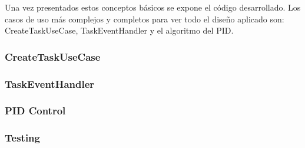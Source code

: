 Una vez presentados estos conceptos básicos se expone el código desarrollado.
Los casos de uso más complejos y completos para ver todo el diseño aplicado son: CreateTaskUseCase, TaskEventHandler y el algoritmo del PID\@.

\subsubsection{CreateTaskUseCase}\label{subsubsec:CreateTaskUseCase}


\newpage
\subsubsection{TaskEventHandler}


\newpage
\subsubsection{PID Control}\label{subsubsec:pidControl}


\newpage
\subsubsection{Testing}



